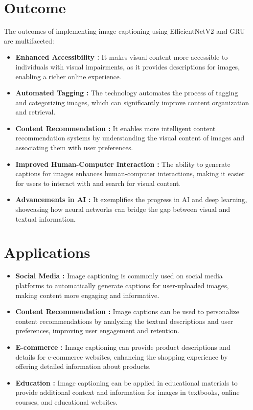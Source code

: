 \documentclass[oneside,a4paper,12pt]{report}
\begin{document}
\section{Outcome}
The outcomes of implementing image captioning using EfficientNetV2 and GRU are multifaceted:
\begin{itemize}

\item \textbf{Enhanced Accessibility :} It makes visual content more accessible to individuals with visual impairments, as it provides descriptions for images, enabling a richer online experience.

\item \textbf{Automated Tagging :} The technology automates the process of tagging and categorizing images, which can significantly improve content organization and retrieval.

\item \textbf{Content Recommendation :} It enables more intelligent content recommendation systems by understanding the visual content of images and associating them with user preferences.

\item \textbf{Improved Human-Computer Interaction :} The ability to generate captions for images enhances human-computer interactions, making it easier for users to interact with and search for visual content.

\item \textbf{Advancements in AI :} It exemplifies the progress in AI and deep learning, showcasing how neural networks can bridge the gap between visual and textual information.

\end{itemize}

\section{Applications}
\begin{itemize}
\item \textbf{Social Media : }Image captioning is commonly used on social media platforms to automatically generate captions for user-uploaded images, making content more engaging and informative.
 \item \textbf{Content Recommendation : }Image captions can be used to personalize content recommendations by analyzing the textual descriptions and user preferences, improving user engagement and retention.
 \item \textbf{E-commerce : }Image captioning can provide product descriptions and details for e-commerce websites, enhancing the shopping experience by offering detailed information about products.
 \item \textbf{Education : }Image captioning can be applied in educational materials to provide additional context and information for images in textbooks, online courses, and educational websites.
\end{itemize}
\end{document}
